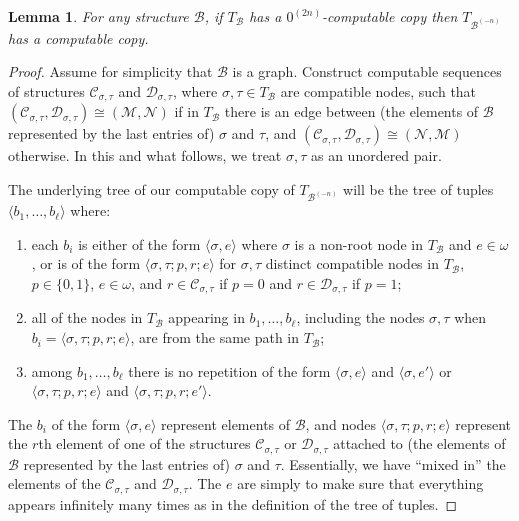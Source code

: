 \documentclass{article}
\newcommand{\Inv}[2]{{#2}^{(-#1)}}
\newtheorem{lem}[thm]{Lemma}
\theoremstyle{definition}
\begin{document}
	\begin{lem}
		For any structure $\mathcal{B}$, if $T_{\mathcal{B}}$ has a $0^{(2n)}$-computable copy then $T_{\Inv{n}{\mathcal{B}}}$ has a computable copy.
	\end{lem}
	\begin{proof}
		Assume for simplicity that $\mathcal{B}$ is a graph. Construct computable sequences of structures $\mathcal{C}_{\sigma,\tau}$ and $\mathcal{D}_{\sigma,\tau}$, where $\sigma, \tau \in T_{\mathcal{B}}$ are compatible nodes, such that $(\mathcal{C}_{\sigma,\tau},\mathcal{D}_{\sigma,\tau}) \cong (\mathcal{M},\mathcal{N})$ if in $T_{\mathcal{B}}$ there is an edge between (the elements of $\mathcal{B}$ represented by the last entries of) $\sigma$ and $\tau$, and $(\mathcal{C}_{\sigma,\tau},\mathcal{D}_{\sigma,\tau}) \cong (\mathcal{N},\mathcal{M})$ otherwise. In this and what follows, we treat $\sigma,\tau$ as an unordered pair.
		
		The underlying tree of our computable copy of $T_{\Inv{n}{\mathcal{B}}}$ will be the tree of tuples $\langle b_1,\ldots,b_\ell \rangle$ where:
		\begin{enumerate}
			\item each $b_i$ is either of the form $\langle \sigma,e \rangle$ where $\sigma$ is a non-root node in $T_{\mathcal{B}}$ and $e \in \omega$, or is of the form $\langle \sigma,\tau; p, r ; e \rangle$ for $\sigma,\tau$ distinct compatible nodes in $T_{\mathcal{B}}$, $p \in \{0,1\}$, $e \in \omega$, and $r \in \mathcal{C}_{\sigma,\tau}$ if $p = 0$ and $r \in \mathcal{D}_{\sigma,\tau}$ if $p = 1$;
			\item all of the nodes in $T_{\mathcal{B}}$ appearing in $b_1,\ldots,b_\ell$, including the nodes $\sigma,\tau$ when $b_i = \langle \sigma,\tau; p, r ; e \rangle$, are from the same path in $T_{\mathcal{B}}$;
			\item among $b_1,\ldots,b_\ell$ there is no repetition of the form $\langle \sigma,e \rangle$ and $\langle \sigma,e' \rangle$ or $\langle \sigma,\tau; p, r ; e \rangle$ and $\langle \sigma,\tau; p, r ; e' \rangle$.
		\end{enumerate}
		The $b_i$ of the form $\langle \sigma,e \rangle$ represent elements of $\mathcal{B}$, and nodes $\langle \sigma,\tau; p, r ; e \rangle$ represent the $r$th element of one of the structures $\mathcal{C}_{\sigma,\tau}$ or $\mathcal{D}_{\sigma,\tau}$ attached to (the elements of $\mathcal{B}$ represented by the last entries of) $\sigma$ and $\tau$. Essentially, we have ``mixed in'' the elements of the $\mathcal{C}_{\sigma,\tau}$ and $\mathcal{D}_{\sigma,\tau}$. The $e$ are simply to make sure that everything appears infinitely many times as in the definition of the tree of tuples.
		

\end{proof}
\end{document}
